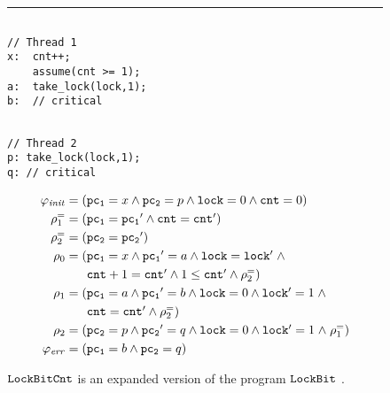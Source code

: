 \begin{figure}[t]
  \hrule
  \centering
  \begin{minipage}[t]{.44\columnwidth} 
\begin{verbatim} 

// Thread 1 
x:  cnt++;
    assume(cnt >= 1);
a:  take_lock(lock,1);
b:  // critical 
\end{verbatim}
  \end{minipage}
  \hfill
  \begin{minipage}[t]{.44\columnwidth} 
\begin{verbatim}

// Thread 2
p: take_lock(lock,1);
q: // critical
\end{verbatim}
  \end{minipage}
  \begin{minipage}[t]{\columnwidth}
  \centering
    \begin{equation*}
     \begin{array}[t]{r@{\;=\;}l@{}}
       \SymbInit  &(\pcone=x \land \pctwo=p \land \lock=0 \land\local=0)      \\[\jot]
       \relLocEqOf{1} & (\pcone=\pcone' \land \local = \local' ) \\[\jot]
       \relLocEqOf{2} & ( \pctwo=\pctwo' ) \\[\jot]
       \rel_{0}    &(
       \begin{array}[t]{@{}l}
         \pcone=x \land \pcone'=a \land \lock=\lock' \mathrel{\land}  \\[\jot]
         \local+1 = \local' \land 1\leq\local' \land \relLocEqOf{2}  ) \\[\jot]
       \end{array}\\
       \rel_{1}     &( 
       \begin{array}[t]{@{}l}
         \pcone=a \land \pcone'=b \land \lock=0 \land \lock'=1 \mathrel{\land} \\[\jot]
         \local = \local' \land \relLocEqOf{2} ) \\[\jot]
       \end{array}\\
       \rel_{2}    & (
       \begin{array}[t]{@{}l}
         \pctwo=p \land \pctwo'=q \land \lock=0 \land \lock'=1 \mathrel{\land} \relLocEqOf{1} ) \\[\jot]
       \end{array}\\
       \SymbError &(\pcone=b \land \pctwo=q)
     \end{array}
   \end{equation*}
 \end{minipage}
\caption{$\texttt{LockBitCnt}$ is an expanded version of the program $\TakeLockBit\ $.}
\label{fig-ex-cex-prog}
\end{figure}

